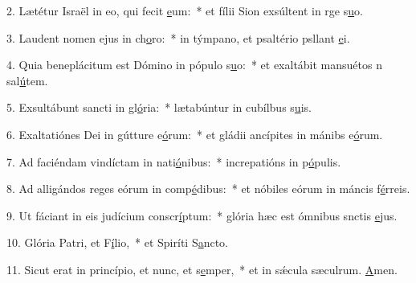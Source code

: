 2. Lætétur Israël in eo, qui fecit \uline{e}um:~* et fílii Sion exsúltent in rge s\uline{u}o.\par 
3. Laudent nomen ejus in ch\uline{o}ro:~* in týmpano, et psaltério psllant \uline{e}i.\par 
4. Quia beneplácitum est Dómino in pópulo s\uline{u}o:~* et exaltábit mansuétos n sal\uline{ú}tem.\par 
5. Exsultábunt sancti in gl\uline{ó}ria:~* lætabúntur in cubílbus s\uline{u}is.\par 
6. Exaltatiónes Dei in gútture e\uline{ó}rum:~* et gládii ancípites in mánibs e\uline{ó}rum.\par 
7. Ad faciéndam vindíctam in nati\uline{ó}nibus:~* increpatións in p\uline{ó}pulis.\par 
8. Ad alligándos reges eórum in comp\uline{é}dibus:~* et nóbiles eórum in máncis f\uline{é}rreis.\par 
9. Ut fáciant in eis judícium conscr\uline{í}ptum:~* glória hæc est ómnibus snctis \uline{e}jus.\par 
10. Glória Patri, et F\uline{í}lio,~* et Spiríti S\uline{a}ncto.\par 
11. Sicut erat in princípio, et nunc, et s\uline{e}mper,~* et in sǽcula sæculrum. \uline{A}men.\par 
